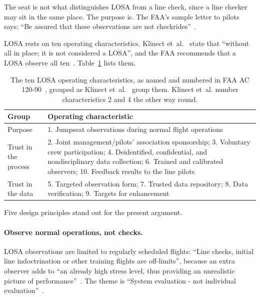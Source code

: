\documentclass[11pt]{article}
\begin{document}
The seat is not what distinguishes LOSA from a line check, since a line checker may sit in the same place. The purpose is. The FAA's sample letter to pilots says: ``Be assured that these observations are not checkrides''~\cite[Appendix~4]{faa2006losa}.

LOSA rests on ten operating characteristics. Klinect et~al.~\cite{klinect2003} state that ``without all in place; it is not considered a LOSA'', and the FAA recommends that a LOSA observe all ten~\cite[para.~10a]{faa2006losa}. Table~\ref{tab:losa} lists them.

\begin{table}[htbp]
\centering
\small
\caption{The ten LOSA operating characteristics, as named and numbered in FAA AC 120-90~\cite[para.~10b]{faa2006losa}, grouped as Klinect et~al.~\cite[``Summary'']{klinect2003} group them. Klinect et~al. number characteristics 2 and 4 the other way round.}
\label{tab:losa}
\begin{tabularx}{\textwidth}{@{}p{3.2cm}X@{}}
\toprule
Group & Operating characteristic \\
\midrule
Purpose & 1. Jumpseat observations during normal flight operations \\
Trust in the process & 2. Joint management/pilots' association sponsorship; 3. Voluntary crew participation; 4. Deidentified, confidential, and nondisciplinary data collection; 6. Trained and calibrated observers; 10. Feedback results to the line pilots \\
Trust in the data & 5. Targeted observation form; 7. Trusted data repository; 8. Data verification; 9. Targets for enhancement \\
\bottomrule
\end{tabularx}
\end{table}

Five design principles stand out for the present argument.

\paragraph{Observe normal operations, not checks.} LOSA observations are limited to regularly scheduled flights: ``Line checks, initial line indoctrination or other training flights are off-limits'', because an extra observer adds to ``an already high stress level, thus providing an unrealistic picture of performance''~\cite[para.~10b(1)]{faa2006losa}. The theme is ``System evaluation - not individual evaluation''~\cite[``Jump seat observations during normal flight operations'']{klinect2003}.
\end{document}
